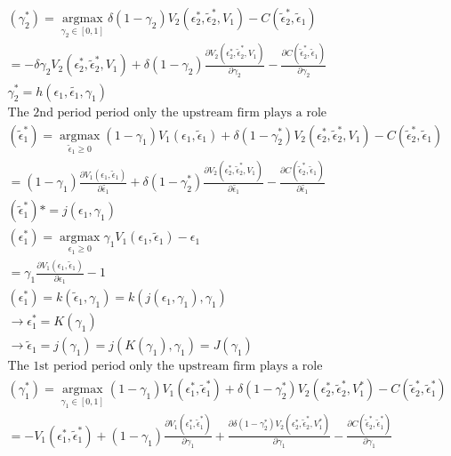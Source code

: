 \documentclass{article}
\begin{document}
\begin{align*}
(\gamma_2^*)= \operatorname*{argmax}_{ \gamma_2 \in [0,1] } \delta (1-\gamma_2)V_2(\epsilon_2^*,\tilde{\epsilon}_2^*,V_1)-C(\tilde{\epsilon}_2^*,\tilde{\epsilon}_1) \\
=-\delta \gamma_2 V_2(\epsilon_2^*,\tilde{\epsilon}_2^*,V_1)
+\delta(1-\gamma_2) \frac{\partial V_2(\epsilon_2^*,\tilde{\epsilon}_2^*,V_1)}{\partial \gamma_2}
-\frac{\partial C(\tilde{\epsilon}_2^*,\tilde{\epsilon}_1)}{\partial \gamma_2} \\ 
\gamma_2^*= h(\epsilon_1,\tilde{\epsilon_1},\gamma_1) \\
\text{The 2nd period period only the upstream firm plays a role} \\
(\tilde{\epsilon}_1^*)= \operatorname*{argmax}_{ \tilde{\epsilon}_1 \geq 0 } 
(1-\gamma_1)V_1(\epsilon_1,\tilde{\epsilon}_1)
+\delta (1-\gamma_2^*)V_2(\epsilon_2^*,\tilde{\epsilon}_2^*,V_1)
-C(\tilde{\epsilon}_2^*,\tilde{\epsilon}_1) \\
= (1-\gamma_1)\frac{\partial V_1(\epsilon_1,\tilde{\epsilon}_1) }{\partial \tilde{\epsilon_1}}
+\delta (1-\gamma_2^*)\frac{\partial V_2(\epsilon_2^*,\tilde{\epsilon}_2^*,V_1)}{\partial \tilde{\epsilon_1}}
-\frac{\partial C(\tilde{\epsilon}_2^*,\tilde{\epsilon}_1)}{\partial \tilde{\epsilon_1}} \\
(\tilde{\epsilon}_1^*)*
=j(\epsilon_1,\gamma_1) \\
(\epsilon_1^*)= \operatorname*{argmax}_{ \epsilon_1 \geq 0 }
\gamma_1 V_1(\epsilon_1,\tilde{\epsilon}_1)-\epsilon_1 \\
= \gamma_1 \frac{\partial V_1(\epsilon_1,\tilde{\epsilon}_1)}{\partial \epsilon_1}-1 \\
(\epsilon_1^*)
= k(\tilde{\epsilon}_1,\gamma_1)
=k(j(\epsilon_1,\gamma_1),\gamma_1) \\
\rightarrow
\epsilon_1^*=K( \gamma_1) \\
\rightarrow \tilde{\epsilon}_1 = j(\gamma_1)=j(K(\gamma_1),\gamma_1)=J(\gamma_1) \\
\text{The 1st period period only the upstream firm plays a role} \\
(\gamma_1^*)= \operatorname*{argmax}_{ \gamma_1 \in [0,1] } 
(1-\gamma_1)V_1(\epsilon_1^*,\tilde{\epsilon}_1^*)
+\delta (1-\gamma_2^*)V_2(\epsilon_2^*,\tilde{\epsilon}_2^*,V_1^*)
-C(\tilde{\epsilon}_2^*,\tilde{\epsilon}_1^*) \\
= -V_1(\epsilon_1^*,\tilde{\epsilon}_1^*)
+ (1-\gamma_1)\frac{\partial V_1(\epsilon_1^*,\tilde{\epsilon}_1^*)}{\partial \gamma_1}
+ \frac{\partial \delta (1-\gamma_2^*)V_2(\epsilon_2^*,\tilde{\epsilon}_2^*,V_1^*)}{\partial \gamma_1}
-\frac{\partial C(\tilde{\epsilon}_2^*,\tilde{\epsilon}_1^*)}{\partial \gamma_1}
\end{align*}
\end{document}
